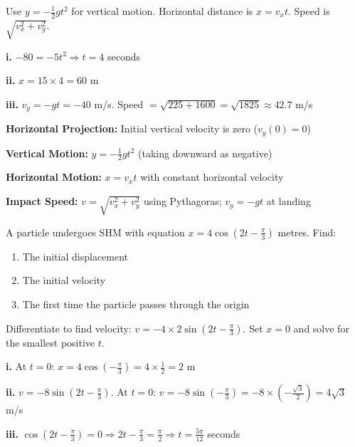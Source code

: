 \begin{hint}
Use $y = -\frac{1}{2}gt^2$ for vertical motion. Horizontal distance is $x = v_x t$. Speed is $\sqrt{v_x^2 + v_y^2}$.
\end{hint}

\begin{solution}
\textbf{i.} $-80 = -5t^2 \Rightarrow t = 4$ seconds

\textbf{ii.} $x = 15 \times 4 = 60$ m

\textbf{iii.} $v_y = -gt = -40$ m/s. Speed $= \sqrt{225 + 1600} = \sqrt{1825} \approx 42.7$ m/s
\end{solution}

\begin{takeaways}
\item \textbf{Horizontal Projection:} Initial vertical velocity is zero ($v_y(0) = 0$)
\item \textbf{Vertical Motion:} $y = -\frac{1}{2}gt^2$ (taking downward as negative)
\item \textbf{Horizontal Motion:} $x = v_x t$ with constant horizontal velocity
\item \textbf{Impact Speed:} $v = \sqrt{v_x^2 + v_y^2}$ using Pythagoras; $v_y = -gt$ at landing
\end{takeaways}

\begin{problem}
A particle undergoes SHM with equation $x = 4\cos(2t - \frac{\pi}{3})$ metres. Find:
\begin{enumerate}[label=\textbf{\roman*.}]
    \item The initial displacement
    \item The initial velocity
    \item The first time the particle passes through the origin
\end{enumerate}
\end{problem}

\begin{hint}
Differentiate to find velocity: $v = -4 \times 2\sin(2t - \frac{\pi}{3})$. Set $x = 0$ and solve for the smallest positive $t$.
\end{hint}

\begin{solution}
\textbf{i.} At $t=0$: $x = 4\cos(-\frac{\pi}{3}) = 4 \times \frac{1}{2} = 2$ m

\textbf{ii.} $v = -8\sin(2t - \frac{\pi}{3})$. At $t=0$: $v = -8\sin(-\frac{\pi}{3}) = -8 \times (-\frac{\sqrt{3}}{2}) = 4\sqrt{3}$ m/s

\textbf{iii.} $\cos(2t - \frac{\pi}{3}) = 0 \Rightarrow 2t - \frac{\pi}{3} = \frac{\pi}{2} \Rightarrow t = \frac{5\pi}{12}$ seconds
\end{solution}

